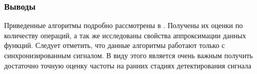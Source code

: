 %
%
%
%
%

\subsubsection{Выводы}
Приведенные алгоритмы подробно рассмотрены в \cite{presti_ieee}. Получены их оценки по количеству операций, а так же
исследованы свойства аппроксимации данных функций. Следует отметить, что данные алгоритмы работают только с синхронизированным сигналом.
В виду этого является очень важным получить достаточно точную оценку частоты на ранних стадиях детектирования сигнала

\newpage
